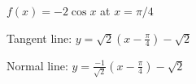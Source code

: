 {$f(x)=-2\cos x$ at $x=\pi/4$
}
{Tangent line: $y = \sqrt{2}\left(x-\frac{\pi}{4}\right)-\sqrt{2}$

Normal line: $y = \frac{-1}{\sqrt{2}}\left(x-\frac{\pi}{4}\right)-\sqrt{2}$
}
